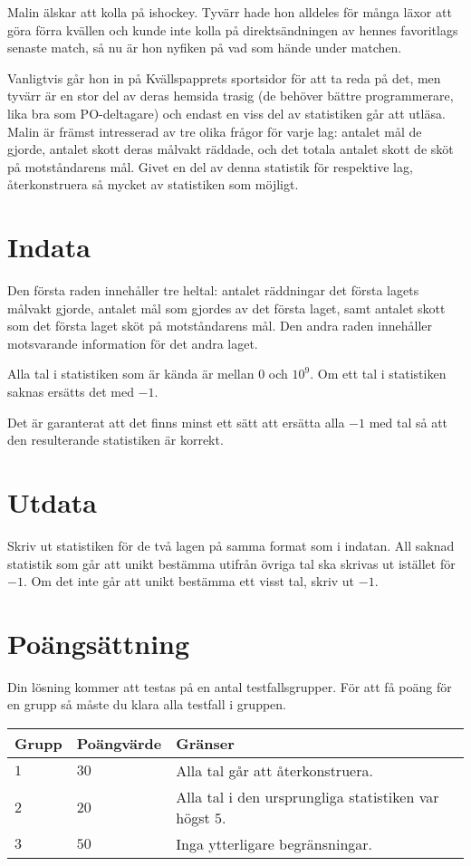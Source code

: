 Malin älskar att kolla på ishockey.
Tyvärr hade hon alldeles för många läxor att göra förra kvällen och kunde inte kolla på direktsändningen av hennes favoritlags senaste match, så nu är hon nyfiken på vad som hände under matchen.

Vanligtvis går hon in på Kvällspapprets sportsidor för att ta reda på det, men tyvärr är en stor del av deras hemsida trasig (de behöver bättre programmerare, lika bra som PO-deltagare) och endast en viss del av statistiken går att utläsa.
Malin är främst intresserad av tre olika frågor för varje lag: antalet mål de gjorde, antalet skott deras målvakt räddade, och det totala antalet skott de sköt på motståndarens mål.
Givet en del av denna statistik för respektive lag, återkonstruera så mycket av statistiken som möjligt.

\section*{Indata}
Den första raden innehåller tre heltal: antalet räddningar det första lagets målvakt gjorde, antalet mål som gjordes av det första laget, samt antalet skott som det första laget sköt på motståndarens mål.
Den andra raden innehåller motsvarande information för det andra laget.

Alla tal i statistiken som är kända är mellan $0$ och $10^9$.
Om ett tal i statistiken saknas ersätts det med $-1$.

Det är garanterat att det finns minst ett sätt att ersätta alla $-1$ med tal så att den resulterande statistiken är korrekt.

\section*{Utdata}
Skriv ut statistiken för de två lagen på samma format som i indatan.
All saknad statistik som går att unikt bestämma utifrån övriga tal ska skrivas ut istället för $-1$.
Om det inte går att unikt bestämma ett visst tal, skriv ut $-1$.

\section*{Poängsättning}
Din lösning kommer att testas på en antal testfallsgrupper.
För att få poäng för en grupp så måste du klara alla testfall i gruppen.

\noindent
\begin{tabular}{| l | l | p{12cm} |}
  \hline
  Grupp & Poängvärde & Gränser \\ \hline
  $1$   & $30$       & Alla tal går att återkonstruera. \\ \hline
  $2$   & $20$       & Alla tal i den ursprungliga statistiken var högst $5$. \\ \hline
  $3$   & $50$       & Inga ytterligare begränsningar. \\ \hline
\end{tabular}

